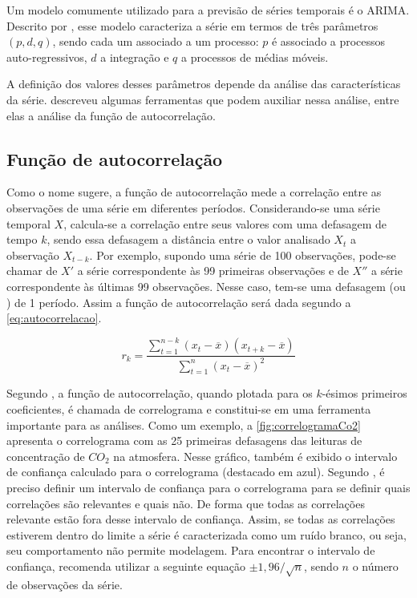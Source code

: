 \documentclass[
    12pt,
    oneside,
    a4paper,
    english,
    brazil
]{abntex2}
\begin{document}
Um modelo comumente utilizado para a  previsão de séries temporais é o ARIMA\@.
Descrito por  , esse  modelo caracteriza a  série em  termos de
três  parâmetros $(p,d,q)$,  sendo  cada  um associado  a  um  processo: $p$  é
associado a processos  auto-regressivos, $d$ a integração e $q$  a processos de
médias móveis.

A   definição  dos   valores   desses  parâmetros   depende   da  análise   das
características da  série.   descreveu algumas  ferramentas que
podem auxiliar nessa análise, entre elas a análise da função de autocorrelação.

\subsection{Função de autocorrelação}\label{sec:corre}

Como  o nome  sugere, a  função de  autocorrelação mede  a correlação  entre as
observações  de uma  série em  diferentes períodos.  Considerando-se uma  série
temporal $X$, calcula-se  a correlação entre seus valores com  uma defasagem de
tempo $k$,  sendo essa defasagem  a distância entre  o valor analisado  $X_t$ a
observação  $X_{t-k}$.  Por exemplo,  supondo  uma  série de  100  observações,
pode-se chamar de $X'$ a série  correspondente às 99 primeiras observações e de
$X''$ a série correspondente às últimas  99 observações. Nesse caso, tem-se uma
defasagem (ou )  de 1 período. Assim a função  de autocorrelação será
dada segundo a \autoref{eq:autocorrelacao}.

\begin{equation}
    \label{eq:autocorrelacao}
    r_k = \frac{\sum_{t=1}^{n-k}{(x_t - \overline{x})(x_{t+k} -
    \overline{x})}}{\sum_{t=1}^{n}{(x_t - \overline{x})^2}}
\end{equation}

Segundo  ,  a  função   de  autocorrelação,  quando  plotada
para  os  $k$-ésimos  primeiros  coeficientes,  é  chamada  de  correlograma  e
constitui-se em uma ferramenta importante para  as análises. Como um exemplo, a
\autoref{fig:correlogramaCo2}  apresenta o  correlograma  com  as 25  primeiras
defasagens das leituras de concentração  de $CO_2$ na atmosfera. Nesse gráfico,
também  é  exibido o  intervalo  de  confiança  calculado para  o  correlograma
(destacado  em  azul).  Segundo   ,  é  preciso  definir  um
intervalo de  confiança para o  correlograma para se definir  quais correlações
são relevantes e  quais não. De forma que todas  as correlações relevante estão
fora desse  intervalo de  confiança. Assim, se  todas as  correlações estiverem
dentro do  limite a série  é caracterizada como um  ruído branco, ou  seja, seu
comportamento não permite  modelagem. Para encontrar o  intervalo de confiança,
 recomenda utilizar a seguinte equação $\pm{}1,96/\sqrt{n}$,
sendo $n$ o número de observações da série.
\end{document}

